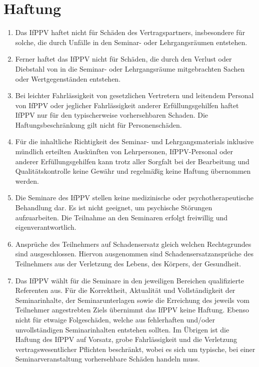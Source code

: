 \documentclass[a4paper, 12pt]{scrartcl}
\begin{document}
    \section{Haftung}
    \begin{enumerate}
	    \item Das IfPPV haftet nicht für Sch\"aden des Vertragspartners, insbesondere f\"ur solche, die durch Unf\"alle in den Seminar- oder Lehrgangsräumen entstehen.
	    
	    \item Ferner haftet das IfPPV nicht für Sch\"aden, die durch den Verlust oder Diebstahl von in die Seminar- oder Lehrgangsr\"aume mitgebrachten Sachen oder Wertgegenst\"anden entstehen.
	    
        \item Bei leichter Fahrl\"assigkeit von gesetzlichen Vertretern und leitendem Personal von IfPPV oder jeglicher Fahrl\"assigkeit anderer Erf\"ullungsgehilfen haftet IfPPV nur f\"ur den typischerweise vorhersehbaren Schaden.
        Die Haftungsbeschr\"ankung gilt nicht für Personensch\"aden.

	    \item F\"ur die inhaltliche Richtigkeit des Seminar- und Lehrgangsmaterials inklusive m\"undlich erteilten Ausk\"unften von Lehrpersonen, IfPPV-Personal oder anderer Erf\"ullungsgehilfen kann trotz aller Sorgfalt bei der Bearbeitung und Qualit\"atskontrolle keine Gew\"ahr und regelm\"a{\ss}ig keine Haftung \"ubernommen werden.
	    
        \item Die Seminare des IfPPV stellen keine medizinische oder psychotherapeutische Behandlung dar. 
        Es ist nicht geeignet, um psychische St\"orungen aufzuarbeiten. 
        Die Teilnahme an den Seminaren erfolgt freiwillig und eigenverantwortlich.

        \item Anspr\"uche des Teilnehmers auf Schadensersatz gleich welchen Rechtsgrundes sind ausgeschlossen.
        Hiervon ausgenommen sind Schadensersatzanspr\"uche des Teilnehmers aus der Verletzung des Lebens, des K\"orpers, der Gesundheit.

        \item Das IfPPV w\"ahlt für die Seminare in den jeweiligen Bereichen qualifizierte Referenten aus.
        F\"ur die Korrektheit, Aktualit\"at und Vollst\"andigkeit der Seminarinhalte, der Seminarunterlagen sowie die Erreichung des jeweils vom Teilnehmer angestrebten Ziels \"ubernimmt das IfPPV keine Haftung.
        Ebenso nicht für etwaige Folgesch\"aden, welche aus fehlerhaften und/oder unvollst\"andigen Seminarinhalten entstehen sollten.
        Im \"Ubrigen ist die Haftung des IfPPV auf Vorsatz, grobe Fahrl\"assigkeit und die Verletzung vertragswesentlicher Pflichten beschr\"ankt, wobei es sich um typische, bei einer Seminarveranstaltung vorhersehbare Sch\"aden handeln muss.
    \end{enumerate}
    
\end{document}
